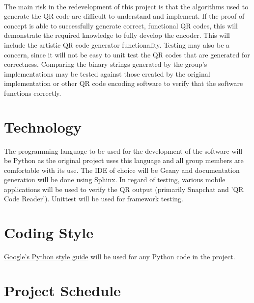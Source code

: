 \documentclass{article}
\begin{document}
	\paragraph{}
	
		The main risk in the redevelopment of this project is that the 
		algorithms used to generate the QR code are difficult to understand and 
		implement. If the proof of concept is able to successfully generate 
		correct, functional QR codes, this will demonstrate the required 
		knowledge to fully develop the encoder. This will include the artistic 
		QR code generator functionality. Testing may also be a concern, since 
		it will not be easy to unit test the QR codes that are generated for 
		correctness. Comparing the binary strings generated by the group's 
		implementations may be tested against those created by the original 
		implementation or other QR code encoding software to verify that the 
		software functions correctly.

\section{Technology}

	\paragraph{}
		
		The programming language to be used for the development of the software 
		will be Python as the original project uses this language and all group 
		members are comfortable with its use. The IDE of choice will be Geany 
		and documentation generation will be done using Sphinx. In regard of testing, various mobile applications will be used to verify the QR output (primarily Snapchat and 'QR Code Reader'). Unittest will be used for framework testing.  

\section{Coding Style}

	\paragraph{}
	
		\href{https://google.github.io/styleguide/pyguide.html}{Google's Python 
		style guide} will be used for any Python code in the project.
	
\section{Project Schedule}
\end{document}
